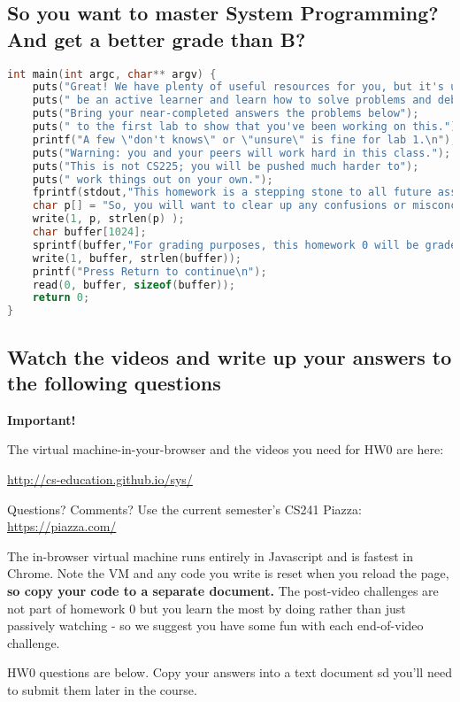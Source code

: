 \subsection{So you want to master System Programming? And get a better grade than B?}
\begin{lstlisting}[language=C]
int main(int argc, char** argv) {
	puts("Great! We have plenty of useful resources for you, but it's up to you to");
	puts(" be an active learner and learn how to solve problems and debug code.");
	puts("Bring your near-completed answers the problems below");
	puts(" to the first lab to show that you've been working on this.");
	printf("A few \"don't knows\" or \"unsure\" is fine for lab 1.\n"); 
	puts("Warning: you and your peers will work hard in this class.");
	puts("This is not CS225; you will be pushed much harder to");
	puts(" work things out on your own.");
	fprintf(stdout,"This homework is a stepping stone to all future assignments.\n");
	char p[] = "So, you will want to clear up any confusions or misconceptions.\n";
	write(1, p, strlen(p) );
	char buffer[1024];
	sprintf(buffer,"For grading purposes, this homework 0 will be graded as part of your lab %d work.\n", 1);
	write(1, buffer, strlen(buffer));
	printf("Press Return to continue\n");
	read(0, buffer, sizeof(buffer));
	return 0;
}
\end{lstlisting}

\subsection{Watch the videos and write up your answers to the following questions}

\textbf{Important!}

The virtual machine-in-your-browser and the videos you need for HW0 are here:

\url{http://cs-education.github.io/sys/}

Questions? Comments? Use the current semester's CS241 Piazza:
\url{https://piazza.com/}

The in-browser virtual machine runs entirely in Javascript and is fastest in Chrome. Note the VM and any code you write is reset when you reload the page, \textbf{so copy your code to a separate document.} The post-video challenges are not part of homework 0 but you learn the most by doing rather than just passively watching - so we suggest you have some fun with each end-of-video challenge.

HW0 questions are below. Copy your answers into a text document sd you'll need to submit them later in the course.

